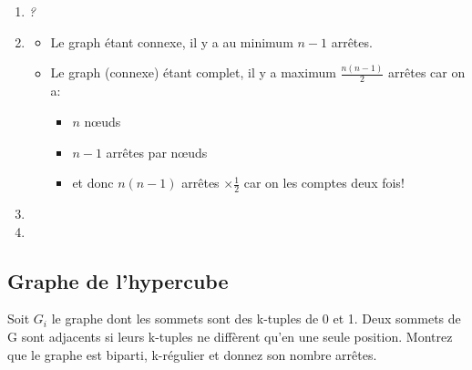 \begin{solution}
\begin{enumerate}
\item{\emph{?}}
\item{
	\begin{itemize}
	\item Le graph étant connexe, il y a au minimum $n-1$ arrêtes.
	\item Le graph (connexe) étant complet, il y a maximum $\frac{n (n-1)}{2}$ arrêtes car on a:
		\begin{itemize}
		\item $n$ nœuds
		\item $n-1$ arrêtes par nœuds
		\item et donc $n (n-1)$ arrêtes $\times \frac{1}{2}$ car on les comptes deux fois!
		\end{itemize}
	\end{itemize}	
}
\item{
	
	}
\item{}
\end{enumerate}
\end{solution}

\subsection{Graphe de l'hypercube}
Soit $G_{i}$ le graphe dont les sommets sont des k-tuples de 0 et 1. Deux sommets de G sont adjacents si leurs k-tuples ne diffèrent qu'en une seule position. Montrez que le graphe est biparti, k-régulier et donnez son nombre arrêtes.\\

